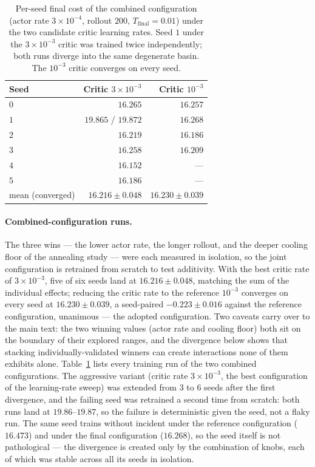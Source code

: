 \documentclass[letterpaper]{article} %
\begin{document}
\begin{table}[t]
\centering
\small
\begin{tabular}{lrr}
\toprule
\textbf{Seed} & \textbf{Critic $3\!\times\!10^{-3}$} & \textbf{Critic $10^{-3}$} \\
\midrule
$0$ & $16.265$ & $16.257$ \\
$1$ & $19.865$ / $19.872$ & $16.268$ \\
$2$ & $16.219$ & $16.186$ \\
$3$ & $16.258$ & $16.209$ \\
$4$ & $16.152$ & --- \\
$5$ & $16.186$ & --- \\
\midrule
mean (converged) & $16.216 \pm 0.048$ & $16.230 \pm 0.039$ \\
\bottomrule
\end{tabular}
\caption{Per-seed final cost of the combined configuration (actor rate $3 \times 10^{-4}$, rollout $200$, $T_{\mathrm{final}} = 0.01$) under the two candidate critic learning rates. Seed $1$ under the $3 \times 10^{-3}$ critic was trained twice independently; both runs diverge into the same degenerate basin. The $10^{-3}$ critic converges on every seed.}
\label{tab:xcombined}
\end{table}

\paragraph{Combined-configuration runs.}
The three wins --- the lower actor rate, the longer rollout, and the deeper cooling floor of the annealing study --- were each measured in isolation, so the joint configuration is retrained from scratch to test additivity. With the best critic rate of $3 \times 10^{-3}$, five of six seeds land at $16.216 \pm 0.048$, matching the sum of the individual effects; reducing the critic rate to the reference $10^{-3}$ converges on every seed at $16.230 \pm 0.039$, a seed-paired $-0.223 \pm 0.016$ against the reference configuration, unanimous --- the adopted configuration. Two caveats carry over to the main text: the two winning values (actor rate and cooling floor) both sit on the boundary of their explored ranges, and the divergence below shows that stacking individually-validated winners can create interactions none of them exhibits alone. Table~\ref{tab:xcombined} lists every training run of the two combined configurations. The aggressive variant (critic rate $3 \times 10^{-3}$, the best configuration of the learning-rate sweep) was extended from $3$ to $6$ seeds after the first divergence, and the failing seed was retrained a second time from scratch: both runs land at $19.86$--$19.87$, so the failure is deterministic given the seed, not a flaky run. The same seed trains without incident under the reference configuration ($16.473$) and under the final configuration ($16.268$), so the seed itself is not pathological --- the divergence is created only by the combination of knobs, each of which was stable across all its seeds in isolation.
\end{document}
